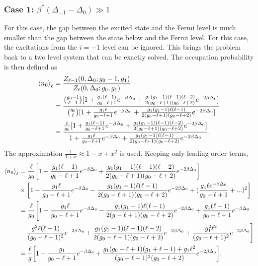 \subsubsection{Case 1: $\beta^*(\Delta_{-1}-\Delta_0)\gg 1$}
For this case, the gap between the excited state and the Fermi level is much smaller than the gap between the state below and the Fermi level. For this case, the excitations from the $i=-1$ level can be ignored. This brings the problem back to a two level system that can be exactly solved. The occupation probability is then defined as
\begin{align}
    \left<{n_0}\right>_\ell&=\frac{Z_{\ell-1}(0,\Delta_0;g_0-1,g_1)}{Z_\ell(0,\Delta_0;g_0,g_1)}\nonumber\\
    &=\frac{{g_0-1\choose \ell-1}[1+\frac{g_1(\ell-1)}{g_0-\ell+1}e^{-\beta\Delta_0} +\frac{g_1(g_1-1)(\ell-1)(\ell-2)}{2(g_0-\ell+1)(g_0-\ell+2)}e^{-2\beta\Delta_0}]}{{g_0\choose \ell}[1+\frac{g_1 \ell}{g_0-\ell+1}e^{-\beta\Delta_0} +\frac{g_1(g_1-1)\ell(\ell-1)}{2(g_0-\ell+1)(g_0-\ell+2)}e^{-2\beta\Delta_0}]}\nonumber\\
    &=\frac{\frac{\ell}{g_0} [1+\frac{g_1(\ell-1)}{g_0-\ell+1}e^{-\beta\Delta_0} +\frac{g_1(g_1-1)(\ell-1)(\ell-2)}{2(g_0-\ell+1)(g_0-\ell+2)}e^{-2\beta\Delta_0}]}{1+\frac{g_1 \ell}{g_0-\ell+1}e^{-\beta\Delta_0} +\frac{g_1(g_1-1)\ell(\ell-1)}{2(g_0-\ell+1)(g_0-\ell+2)}e^{-2\beta\Delta_0}}.
\end{align}
The approximation $\frac{1}{1+x}\approx 1-x+x^2$ is used. Keeping only leading order terms,
\begin{align}
    \left<{n_0}\right>_\ell&=\frac{\ell}{g_0}\qty[1+\frac{g_1(\ell-1)}{g_0-\ell+1}e^{-\beta\Delta_0} +\frac{g_1(g_1-1)(\ell-1)(\ell-2)}{2(g_0-\ell+1)(g_0-\ell+2)}e^{-2\beta\Delta_0}]\nonumber\\
    &\times \qty[1-\frac{g_1\ell}{g_0-\ell+1}e^{-\beta\Delta_0}-\frac{g_1(g_1-1)\ell(\ell-1)}{2(g_0-\ell+1)(g_0-\ell+2)}e^{-2\beta\Delta_0}+(\frac{g_1 \ell e^{-\beta\Delta_0}}{g_0-\ell+1}+...)^2] \nonumber\\
    &=\frac{\ell}{g_0}\Biggr[1-\frac{g_1\ell}{g_0-\ell+1}e^{-\beta\Delta_0}-\frac{g_1(g_1-1)\ell(\ell-1)}{2(g-\ell+1)(g_0-\ell+2)}e^{-2\beta\Delta_0}+\frac{g_1(\ell-1)}{g_0-\ell+1}e^{-\beta\Delta_0}\nonumber\\
    &-\frac{g_1^2 \ell(\ell-1)}{(g_0-\ell+1)^2}e^{-2\beta\Delta_0}+\frac{g_1(g_1-1)(\ell-1)(\ell-2)}{2(g_0-\ell+1)(g_0-\ell+2)}e^{-2\beta\Delta_0}+\frac{g_1^2\ell^2}{(g_0-\ell+1)^2}e^{-2\beta\Delta_0}\Biggr]\nonumber\\
    &=\frac{\ell}{g}\qty[1-\frac{g_1}{g_0-\ell+1}e^{-\beta\Delta_0}+\frac{g_1(g_0-\ell+1)(g_1+\ell-1)+g_1\ell^2}{(g_0-\ell+1)^2(g_0-\ell+2)}e^{-2\beta\Delta_0}]. \label{2.39}
\end{align}          
